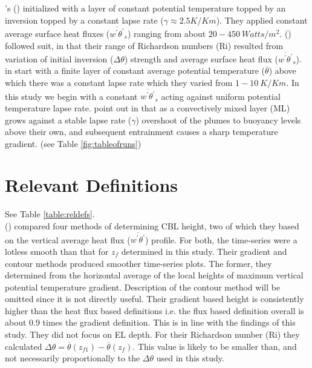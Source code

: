 \citeauthor{SullMoengStev}'s (\cite{SullMoengStev}) initialized with a layer of constant potential temperature topped by an inversion topped by a constant lapse rate ($\gamma \approx 2.5 K/Km$). They applied constant average surface heat fluxes ($\overline{w^{'}\theta^{'}}_{s}$) ranging from about $20 - 450 \ Watts/m^{2}$. \citeauthor{BrooksFowler2} (\cite{BrooksFowler2}) followed suit, in that their range of Richardson numbers (\acs{Ri}) resulted from variation of initial inversion ($\Delta \theta$) strength and average surface heat flux ($\overline{w^{'}\theta^{'}}_{s}$).  \citeauthor{FedConzMir04} in \cite{FedConzMir04} start with a finite layer of constant average potential temperature ($\overline{\theta}$) above which there was a constant lapse rate which they varied from  $1 - 10 \ K/Km$. In this study we begin with a constant $\overline{w^{'}\theta^{'}}_{s}$ acting against uniform potential temperature lapse rate.  \citeauthor{SchmidtSchu} point out in \cite{SchmidtSchu} that as a convectively mixed layer (\acs{ML}) grows against a stable lapse rate ($\gamma$) overshoot of the plumes to buoyancy levels above their own, and subsequent entrainment causes a sharp temperature gradient. (see Table \ref{fig:tableofruns}) 


\section{Relevant Definitions}

\FloatBarrier

See Table \ref{table:reldefs}.\\

\citeauthor{SullMoengStev} (\cite{SullMoengStev}) compared four methods of determining \acs{CBL} height, two of which they based on the vertical average heat flux ($\overline{w^{'}\theta^{'}}$) profile. For both, the time-series were a lotless smooth than that for $z_{f}$ determined in this study.  Their gradient and contour methods produced smoother time-series plots.  The former, they determined from the horizontal average of the local heights of maximum vertical potential temperature gradient.  Description of the contour method will be omitted since it is not directly useful. Their gradient based height is consistently higher than the heat flux based definitions i.e. the flux based definition overall is about 0.9 times the gradient definition. This is in line with the findings of this study. They did not focus on \acs{EL} depth. For their Richardson number (\acs{Ri}) they calculated $\Delta \theta = \overline{\theta}(z_{f1})-\overline{\theta}(z_{f})$.  This value is likely to be smaller than, and not necessarily proportionally to the $\Delta \theta$ used in this study. \\

